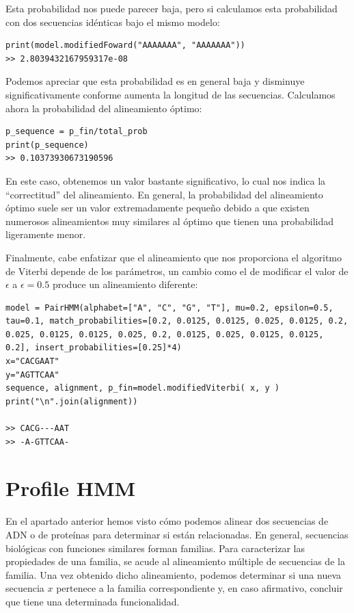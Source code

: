 \begin{exampleth}
Esta probabilidad nos puede parecer baja, pero si calculamos esta probabilidad con dos secuencias idénticas bajo el mismo modelo:
\begin{verbatim}
print(model.modifiedFoward("AAAAAAA", "AAAAAAA"))
>> 2.8039432167959317e-08
\end{verbatim}

Podemos apreciar que esta probabilidad es en general baja y disminuye significativamente conforme aumenta la longitud de las secuencias. Calculamos ahora la probabilidad del alineamiento óptimo:
\begin{verbatim}
p_sequence = p_fin/total_prob
print(p_sequence)
>> 0.10373930673190596
\end{verbatim}
En este caso, obtenemos un valor bastante significativo, lo cual nos indica la \enquote{correctitud} del alineamiento. En general, la probabilidad del alineamiento óptimo suele ser un valor extremadamente pequeño debido a que existen numerosos alineamientos muy similares al óptimo que tienen una probabilidad ligeramente menor.

Finalmente, cabe enfatizar que el alineamiento que nos proporciona el algoritmo de Viterbi depende de los parámetros, un cambio como el de modificar el valor de $\epsilon$ a $\epsilon=0.5$ produce un alineamiento diferente:

\begin{verbatim}
model = PairHMM(alphabet=["A", "C", "G", "T"], mu=0.2, epsilon=0.5, tau=0.1, match_probabilities=[0.2, 0.0125, 0.0125, 0.025, 0.0125, 0.2, 0.025, 0.0125, 0.0125, 0.025, 0.2, 0.0125, 0.025, 0.0125, 0.0125, 0.2], insert_probabilities=[0.25]*4)
x="CACGAAT"
y="AGTTCAA"
sequence, alignment, p_fin=model.modifiedViterbi( x, y )
print("\n".join(alignment))

>> CACG---AAT
>> -A-GTTCAA-
\end{verbatim}
\end{exampleth}

\section{Profile HMM}
En el apartado anterior hemos visto cómo podemos alinear dos secuencias de ADN o de proteínas para determinar si están relacionadas. En general, secuencias biológicas con funciones similares forman familias. Para caracterizar las propiedades de una familia, se acude al alineamiento múltiple de secuencias de la familia. Una vez obtenido dicho alineamiento, podemos determinar si una nueva secuencia $x$ pertenece a la familia correspondiente y, en caso afirmativo, concluir que tiene una determinada funcionalidad. 

